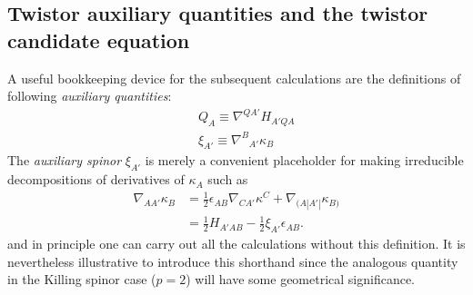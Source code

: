 \documentclass[10pt,a4paper]{article}
\theoremstyle{plain}
\begin{document}
{  \subsection{Twistor auxiliary quantities and the twistor candidate equation}
A useful bookkeeping device for the subsequent
calculations are the definitions of following \emph{auxiliary quantities}:
\begin{subequations}
  \begin{eqnarray}
      && Q_{A}  \equiv \nabla^{QA'}H_{A'QA} \label{def_Q_twistor} \\
      && \xi_{A'} \equiv \nabla^B{}_{A'}\kappa_B \label{def_xi_twistor}
  \end{eqnarray}
\end{subequations}
  The \emph{auxiliary spinor} $\xi_{A'}$ is merely a convenient
  placeholder for making irreducible decompositions of derivatives of
  $\kappa_A$ such as
  \begin{align}\label{decomp_Der_kappa}
    \nabla_{AA'}\kappa _{B} & = \tfrac{1}{2} \epsilon _{AB}
    \nabla_{CA'}\kappa ^{C} + \nabla_{(A|A'|}\kappa _{B)}
 \\ & = \tfrac{1}{2} H_{A'AB} - \tfrac{1}{2} \xi _{A'} \epsilon_{AB}.
  \end{align}
  and in principle one can carry out all the calculations without this
  definition. It is nevertheless illustrative to introduce this
  shorthand since the analogous quantity in the Killing spinor case
  ($p=2$) will have some geometrical significance.

  \medskip
  
}
\end{document}
